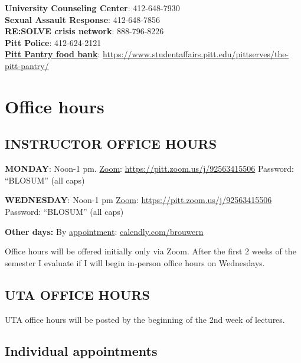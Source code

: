 \documentclass[
]{book}
\begin{document}
\textbf{University Counseling Center}: 412-648-7930\\
\textbf{Sexual Assault Response}: 412-648-7856\\
\textbf{RE:SOLVE crisis network}: 888-796-8226\\
\textbf{Pitt Police}: 412-624-2121\\
\href{https://www.studentaffairs.pitt.edu/pittserves/the-pitt-pantry/}{\textbf{Pitt Pantry food bank}}: \url{https://www.studentaffairs.pitt.edu/pittserves/the-pitt-pantry/}

\hypertarget{office-hours}{%
\chapter{Office hours}\label{office-hours}}

\hypertarget{instructor-office-hours}{%
\section{INSTRUCTOR OFFICE HOURS}\label{instructor-office-hours}}

\textbf{MONDAY}: Noon-1 pm.
\href{https://pitt.zoom.us/j/92563415506}{Zoom}: \url{https://pitt.zoom.us/j/92563415506}
Password: ``BLOSUM'' (all caps)

\textbf{WEDNESDAY}: Noon-1 pm
\href{https://pitt.zoom.us/j/92563415506}{Zoom}: \url{https://pitt.zoom.us/j/92563415506}
Password: ``BLOSUM'' (all caps)

\textbf{Other days:} By \href{www.calendly.com/brouwern}{appointment}: \href{www.calendly.com/brouwern}{calendly.com/brouwern}

Office hours will be offered initially only via Zoom. After the first 2 weeks of the semester I evaluate if I will begin in-person office hours on Wednesdays.

\hypertarget{uta-office-hours}{%
\section{UTA OFFICE HOURS}\label{uta-office-hours}}

UTA office hours will be posted by the beginning of the 2nd week of lectures.\\

\hypertarget{individual-appointments}{%
\section{Individual appointments}\label{individual-appointments}}
\end{document}
